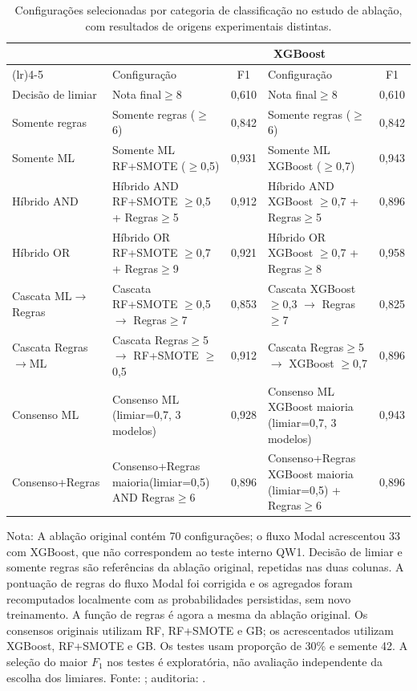 \begin{table}[htbp]
\centering
\caption{Configurações selecionadas por categoria de classificação no estudo de ablação, com resultados de origens experimentais distintas.}
\label{tab:ablation-best-category}
\footnotesize
\begin{tabular}{>{\raggedright\arraybackslash}p{3cm}>{\raggedright\arraybackslash}p{3.2cm}c>{\raggedright\arraybackslash}p{3.2cm}c}
\toprule
\multirow{2}{*}{Categoria} & \multicolumn{2}{c}{Ablação original} & \multicolumn{2}{c}{XGBoost} \\
\cmidrule(lr){2-3} \cmidrule(lr){4-5}
 & Configuração & F1 & Configuração & F1 \\
\midrule
Decisão de limiar & Nota final$\geq$8 & 0,610 & Nota final$\geq$8 & 0,610 \\
Somente regras & Somente regras ($\geq$6) & 0,842 & Somente regras ($\geq$6) & 0,842 \\
Somente ML & Somente ML RF+SMOTE ($\geq$0,5) & 0,931 & Somente ML XGBoost ($\geq$0,7) & 0,943 \\
Híbrido AND & Híbrido AND RF+SMOTE $\geq$0,5 + Regras$\geq$5 & 0,912 & Híbrido AND XGBoost $\geq$0,7 + Regras$\geq$5 & 0,896 \\
Híbrido OR & Híbrido OR RF+SMOTE $\geq$0,7 + Regras$\geq$9 & 0,921 & Híbrido OR XGBoost $\geq$0,7 + Regras$\geq$8 & 0,958 \\
Cascata ML$\rightarrow$Regras & Cascata RF+SMOTE $\geq$0,5 $\rightarrow$ Regras$\geq$7 & 0,853 & Cascata XGBoost $\geq$0,3 $\rightarrow$ Regras$\geq$7 & 0,825 \\
Cascata Regras$\rightarrow$ML & Cascata Regras$\geq$5 $\rightarrow$ RF+SMOTE $\geq$0,5 & 0,912 & Cascata Regras$\geq$5 $\rightarrow$ XGBoost $\geq$0,7 & 0,896 \\
Consenso ML & Consenso ML (limiar=0,7, 3 modelos) & 0,928 & Consenso ML XGBoost maioria (limiar=0,7, 3 modelos) & 0,943 \\
Consenso+Regras & Consenso+Regras maioria(limiar=0,5) AND Regras$\geq$6 & 0,896 & Consenso+Regras XGBoost maioria (limiar=0,5) + Regras$\geq$6 & 0,896 \\
\bottomrule
\end{tabular}
\vspace{2pt}
\par\small Nota: A ablação original contém 70 configurações; o fluxo Modal acrescentou 33 com XGBoost, que não correspondem ao teste interno QW1. Decisão de limiar e somente regras são referências da ablação original, repetidas nas duas colunas. A pontuação de regras do fluxo Modal foi corrigida e os agregados foram recomputados localmente com as probabilidades persistidas, sem novo treinamento. A função de regras é agora a mesma da ablação original. Os consensos originais utilizam RF, RF+SMOTE e GB; os acrescentados utilizam XGBoost, RF+SMOTE e GB. Os testes usam proporção de 30\% e semente 42. A seleção do maior $F_1$ nos testes é exploratória, não avaliação independente da escolha dos limiares. Fonte: ; auditoria: .
\end{table}
